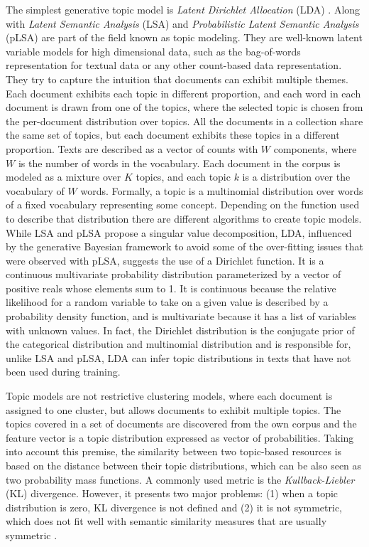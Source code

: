 The simplest generative topic model is \textit{Latent Dirichlet Allocation} (LDA) \citep{Blei2003}. Along with \textit{Latent Semantic Analysis} (LSA) \citep{Deerwester1990} and \textit{Probabilistic Latent Semantic Analysis} (pLSA) \citep{Hofmann2001} are part of the field known as topic modeling. They are well-known latent variable models for high dimensional data, such as the bag-of-words representation for textual data or any other count-based data representation. They try to capture the intuition that documents can exhibit multiple themes. Each document exhibits each topic in different proportion, and each word in each document is drawn from one of the topics, where the selected topic is chosen from the per-document distribution over topics. All the documents in a collection share the same set of topics, but each document exhibits these topics in a different proportion. Texts are described as a vector of counts with $W$ components, where $W$ is the number of words in the vocabulary. Each document in the corpus is modeled as a mixture over $K$ topics, and each topic $k$ is a distribution over the vocabulary of $W$ words. Formally, a topic is a multinomial distribution over words of a fixed vocabulary representing some concept. Depending on the function used to describe that distribution there are different algorithms to create topic models. While LSA and pLSA propose a singular value decomposition, LDA, influenced by the generative Bayesian framework to avoid some of the over-fitting issues that were observed with pLSA, suggests the use of a Dirichlet function. It is a continuous multivariate probability distribution parameterized by a vector of positive reals whose elements sum to 1.  It is continuous because the relative likelihood for a random variable to take on a given value is described by a probability density function, and is multivariate because it has a list of variables with unknown values. In fact, the Dirichlet distribution is the conjugate prior of the categorical distribution and multinomial distribution and is responsible for, unlike LSA and pLSA, LDA can infer topic distributions in texts that have not been used during training.

Topic models are not restrictive clustering models, where each document is assigned to one cluster, but allows documents to exhibit multiple topics. The topics covered in a set of documents are discovered from the own corpus and the feature vector is a topic distribution expressed as vector of probabilities. Taking into account this premise, the similarity between two topic-based resources is based on the distance between their topic distributions, which can be also seen as two probability mass functions. A commonly used metric is the \textit{Kullback-Liebler} (KL) divergence. However, it presents two major problems: (1) when a topic distribution is zero, KL divergence is not defined and (2) it is not symmetric, which does not fit well with semantic similarity measures that are usually symmetric \citep{Rus2013}.

